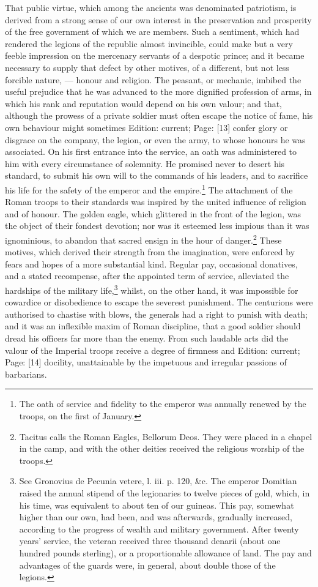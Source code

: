 That public virtue, which among the ancients was denominated patriotism, is derived from a strong sense of our own interest in the preservation and prosperity of the free government of which we are members. Such a sentiment, which had rendered the legions of the republic almost invincible, could make but a very feeble impression on the mercenary servants of a despotic prince; and it became necessary to supply that defect by other motives, of a different, but not less forcible nature, \texthebrew{—} honour and religion. The peasant, or mechanic, imbibed the useful prejudice that he was advanced to the more dignified profession of arms, in which his rank and reputation would depend on his own valour; and that, although the prowess of a private soldier must often escape the notice of fame, his own behaviour might sometimes Edition: current; Page: [13] confer glory or disgrace on the company, the legion, or even the army, to whose honours he was associated. On his first entrance into the service, an oath was administered to him with every circumstance of solemnity. He promised never to desert his standard, to submit his own will to the commands of his leaders, and to sacrifice his life for the safety of the emperor and the empire.\footnote{The oath of service and fidelity to the emperor was annually renewed by the troops, on the first of January.} The attachment of the Roman troops to their standards was inspired by the united influence of religion and of honour. The golden eagle, which glittered in the front of the legion, was the object of their fondest devotion; nor was it esteemed less impious than it was ignominious, to abandon that sacred ensign in the hour of danger.\footnote{Tacitus calls the Roman Eagles, Bellorum Deos. They were placed in a chapel in the camp, and with the other deities received the religious worship of the troops.} These motives, which derived their strength from the imagination, were enforced by fears and hopes of a more substantial kind. Regular pay, occasional donatives, and a stated recompense, after the appointed term of service, alleviated the hardships of the military life,\footnote{See Gronovius de Pecunia vetere, l. iii. p. 120, \&c. The emperor Domitian raised the annual stipend of the legionaries to twelve pieces of gold, which, in his time, was equivalent to about ten of our guineas. This pay, somewhat higher than our own, had been, and was afterwards, gradually increased, according to the progress of wealth and military government. After twenty years\texthebrew{}’ service, the veteran received three thousand denarii (about one hundred pounds sterling), or a proportionable allowance of land. The pay and advantages of the guards were, in general, about double those of the legions.} whilst, on the other hand, it was impossible for cowardice or disobedience to escape the severest punishment. The centurions were authorised to chastise with blows, the generals had a right to punish with death; and it was an inflexible maxim of Roman discipline, that a good soldier should dread his officers far more than the enemy. From such laudable arts did the valour of the Imperial troops receive a degree of firmness and Edition: current; Page: [14] docility, unattainable by the impetuous and irregular passions of barbarians.

